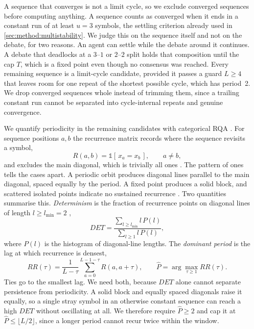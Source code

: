 A sequence that converges is not a limit cycle, so we exclude converged sequences
before computing anything. A sequence counts as converged when it ends in a
constant run of at least $u = 3$ symbols, the settling criterion already used in
\autoref{sec:method:multistability}. We judge this on the sequence itself and not on
the debate, for two reasons. An agent can settle while the debate around it
continues. A debate that deadlocks at a $3$--$1$ or $2$--$2$ split holds that
composition until the cap $T$, which is a fixed point even though no consensus was
reached. Every remaining sequence is a limit-cycle candidate, provided it passes a
guard $L \geq 4$ that leaves room for one repeat of the shortest possible cycle,
which has period~2. We drop converged sequences whole instead of trimming them,
since a trailing constant run cannot be separated into cycle-internal repeats and
genuine convergence.

We quantify periodicity in the remaining candidates with categorical \ac{RQA} \citep{cocodale2014crqa}. For sequence positions $a, b$ the
recurrence matrix \citep{eckmann1987recurrence} records where the sequence revisits a symbol,
\begin{equation}
  R(a,b) = \mathbb{1}[\,x_a = x_b\,], \qquad a \neq b,
\end{equation}
and excludes the main diagonal, which is trivially all ones
\citep{marwan2007recurrence}. The pattern of ones tells the cases apart. A
periodic orbit produces diagonal lines parallel to the main diagonal, spaced equally
by the period. A fixed point produces a solid block, and scattered isolated points indicate no
sustained recurrence \citep{marwan2007recurrence}. Two quantities summarise this.
\emph{Determinism} is the fraction of recurrence points on diagonal lines of length
$l \geq l_{\min} = 2$ \citep{zbilut1992embeddings, webber1994dynamical},
\begin{equation}
  DET = \frac{\sum_{l \geq l_{\min}} l\,P(l)}{\sum_{l \geq 1} l\,P(l)},
\end{equation}
where $P(l)$ is the histogram of diagonal-line lengths. The \emph{dominant period}
is the lag at which recurrence is densest,
\begin{equation}
  RR(\tau) = \frac{1}{L-\tau}\sum_{a=0}^{L-1-\tau} R(a, a+\tau),
  \qquad \hat{P} = \arg\max_{\tau \geq 1} RR(\tau).
\end{equation}
Ties go to the smallest lag.
We need both, because $DET$ alone cannot separate persistence from periodicity. A
solid block and equally spaced diagonals raise it equally, so a single stray symbol
in an otherwise constant sequence can reach a high $DET$ without oscillating at
all. We therefore require $\hat{P} \geq 2$ and cap it at
$\hat{P} \leq \lfloor L/2 \rfloor$, since a longer period cannot recur twice within
the window.

